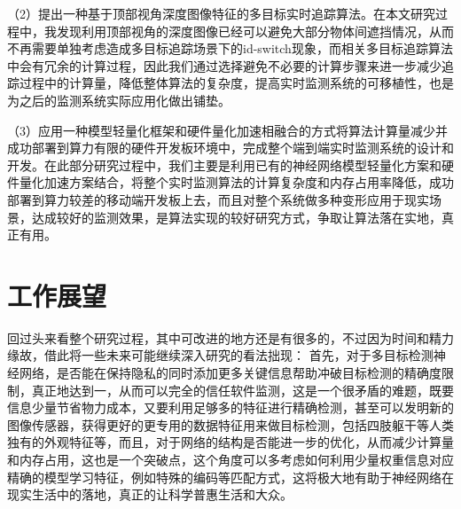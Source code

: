 （2）提出一种基于顶部视角深度图像特征的多目标实时追踪算法。在本文研究过程中，我发现利用顶部视角的深度图像已经可以避免大部分物体间遮挡情况，从而不再需要单独考虑造成多目标追踪场景下的id-switch现象，而相关多目标追踪算法中会有冗余的计算过程，因此我们通过选择避免不必要的计算步骤来进一步减少追踪过程中的计算量，降低整体算法的复杂度，提高实时监测系统的可移植性，也是为之后的监测系统实际应用化做出铺垫。

（3）应用一种模型轻量化框架和硬件量化加速相融合的方式将算法计算量减少并成功部署到算力有限的硬件开发板环境中，完成整个端到端实时监测系统的设计和开发。在此部分研究过程中，我们主要是利用已有的神经网络模型轻量化方案和硬件量化加速方案结合，将整个实时监测算法的计算复杂度和内存占用率降低，成功部署到算力较差的移动端开发板上去，而且对整个系统做多种变形应用于现实场景，达成较好的监测效果，是算法实现的较好研究方式，争取让算法落在实地，真正有用。

\section{工作展望}

回过头来看整个研究过程，其中可改进的地方还是有很多的，不过因为时间和精力缘故，借此将一些未来可能继续深入研究的看法拙现：
首先，对于多目标检测神经网络，是否能在保持隐私的同时添加更多关键信息帮助冲破目标检测的精确度限制，真正地达到一，从而可以完全的信任软件监测，这是一个很矛盾的难题，既要信息少量节省物力成本，又要利用足够多的特征进行精确检测，甚至可以发明新的图像传感器，获得更好的更专用的数据特征用来做目标检测，包括四肢躯干等人类独有的外观特征等，而且，对于网络的结构是否能进一步的优化，从而减少计算量和内存占用，这也是一个突破点，这个角度可以多考虑如何利用少量权重信息对应精确的模型学习特征，例如特殊的编码等匹配方式，这将极大地有助于神经网络在现实生活中的落地，真正的让科学普惠生活和大众。
